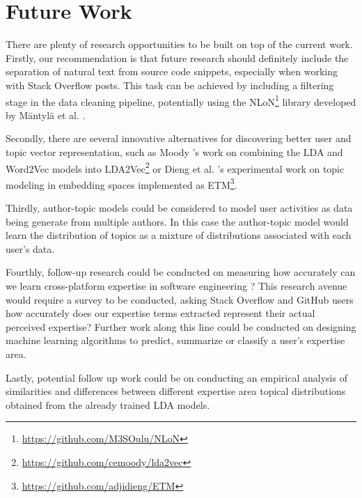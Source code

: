     \section{Future Work\label{sec:futurework}} 
    
        There are plenty of research opportunities to be built on top of the current work. Firstly, our recommendation is that future research should definitely include the separation of natural text from source code snippets, especially when working with Stack Overflow posts. This task can be achieved by including a filtering stage in the data cleaning pipeline, potentially using the  NLoN\footnote{\url{https://github.com/M3SOulu/NLoN}} library developed by M{\"a}ntyl{\"a} et al. \cite{mantyla2018natural}.
        
        Secondly, there are several innovative alternatives for discovering better user and topic vector representation, such as Moody \cite{moody2016mixing}'s work on combining the LDA and Word2Vec models into LDA2Vec\footnote{\url{https://github.com/cemoody/lda2vec}} or Dieng et al. \cite{dieng2019topic}'s experimental work on topic modeling in embedding spaces implemented as ETM\footnote{\url{https://github.com/adjidieng/ETM}}.
        
        Thirdly, author-topic models \cite{rosen2012author} could be considered to model user activities as data being generate from multiple authors. In this case the author-topic model would learn the distribution of topics as a mixture of distributions associated with each user's data. 
        
        Fourthly, follow-up research could be conducted on measuring how accurately can we learn cross-platform expertise in software engineering ? This research avenue would require a survey to be conducted, asking Stack Overflow and GitHub users how accurately does our expertise terms extracted represent their actual perceived expertise? Further work along this line could be conducted on designing machine learning algorithms to predict, summarize or classify a user's expertise area.
        
        Lastly, potential follow up work could be on conducting an empirical analysis of similarities and differences between different expertise area topical distributions obtained from the already trained LDA models.